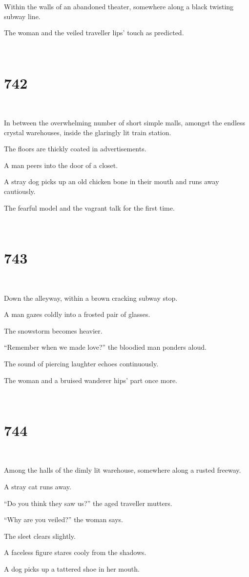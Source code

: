 \documentclass{report}
\begin{document}
Within the walls of an abandoned theater, somewhere along a black twisting subway line.

The woman and the veiled traveller lips' touch as predicted.

~
\chapter*{742}
~

In between the overwhelming number of short simple malls, amongst the endless crystal warehouses, inside the glaringly lit train station.

The floors are thickly coated in advertisements.

A man peers into the door of a closet.

A stray dog picks up an old chicken bone in their mouth and runs away cautiously.

The fearful model and the vagrant talk for the first time.

~
\chapter*{743}
~

Down the alleyway, within a brown cracking subway stop.

A man gazes coldly into a frosted pair of glasses.

The snowstorm becomes heavier.

``Remember when we made love?'' the bloodied man ponders aloud.

The sound of piercing laughter echoes continuously.

The woman and a bruised wanderer hips' part once more.

~
\chapter*{744}
~

Among the halls of the dimly lit warehouse, somewhere along a rusted freeway.

A stray cat runs away.

``Do you think they saw us?'' the aged traveller mutters.

``Why are you veiled?'' the woman says.

The sleet clears slightly.

A faceless figure stares cooly from the shadows.

A dog picks up a tattered shoe in her mouth.
\end{document}

